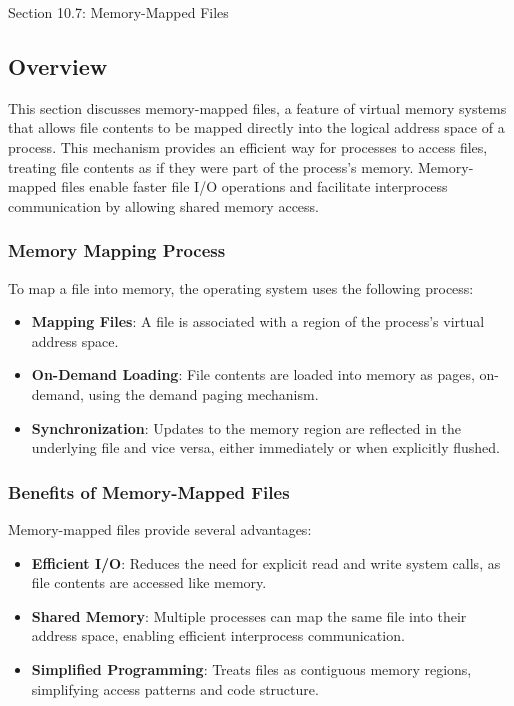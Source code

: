 \begin{notes}{Section 10.7: Memory-Mapped Files}
    \subsection*{Overview}

    This section discusses memory-mapped files, a feature of virtual memory systems that allows file contents to be mapped directly into the logical address space of a process. This mechanism provides 
    an efficient way for processes to access files, treating file contents as if they were part of the process's memory. Memory-mapped files enable faster file I/O operations and facilitate interprocess 
    communication by allowing shared memory access.
    
    \subsubsection*{Memory Mapping Process}
    
    To map a file into memory, the operating system uses the following process:
    \begin{itemize}
        \item \textbf{Mapping Files}: A file is associated with a region of the process's virtual address space.
        \item \textbf{On-Demand Loading}: File contents are loaded into memory as pages, on-demand, using the demand paging mechanism.
        \item \textbf{Synchronization}: Updates to the memory region are reflected in the underlying file and vice versa, either immediately or when explicitly flushed.
    \end{itemize}
    
    \subsubsection*{Benefits of Memory-Mapped Files}
    
    Memory-mapped files provide several advantages:
    \begin{itemize}
        \item \textbf{Efficient I/O}: Reduces the need for explicit read and write system calls, as file contents are accessed like memory.
        \item \textbf{Shared Memory}: Multiple processes can map the same file into their address space, enabling efficient interprocess communication.
        \item \textbf{Simplified Programming}: Treats files as contiguous memory regions, simplifying access patterns and code structure.
    \end{itemize}
    

\end{notes}
